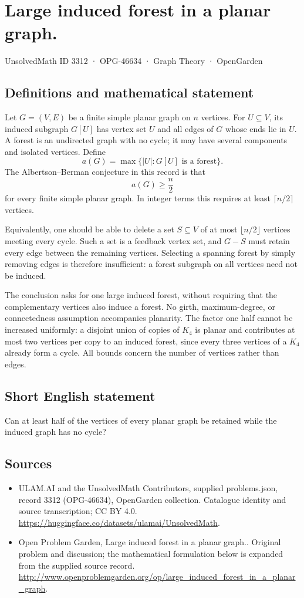 \documentclass[11pt,a4paper]{article}
\begin{document}
\section*{Large induced forest in a planar graph.}\label{3312}
{\small UnsolvedMath ID 3312 · OPG-46634 · Graph Theory · OpenGarden}
\subsection{Definitions and mathematical statement}
Let $G=(V,E)$ be a finite simple planar graph on $n$ vertices. For
$U\subseteq V$, its induced subgraph $G[U]$ has vertex set $U$ and
all edges of $G$ whose ends lie in $U$. A forest is an undirected
graph with no cycle; it may have several components and isolated
vertices. Define
\[
                      a(G)=\max\{|U|:G[U]\text{ is a forest}\}.
\]
The Albertson--Berman conjecture in this record is that
\[
                                a(G)\ge\frac n2
\]
for every finite simple planar graph. In integer terms this requires
at least $\lceil n/2\rceil$ vertices.

Equivalently, one should be able to delete a set $S\subseteq V$ of
at most $\lfloor n/2\rfloor$ vertices meeting every cycle. Such a set
is a feedback vertex set, and $G-S$ must retain every edge between
the remaining vertices. Selecting a spanning forest by simply
removing edges is therefore insufficient: a forest subgraph on all
vertices need not be induced.

The conclusion asks for one large induced forest, without requiring
that the complementary vertices also induce a forest. No girth,
maximum-degree, or connectedness assumption accompanies planarity.
The factor one half cannot be increased uniformly: a disjoint union
of copies of $K_4$ is planar and contributes at most two vertices
per copy to an induced forest, since every three vertices of a
$K_4$ already form a cycle. All bounds concern the number of
vertices rather than edges.
\subsection{Short English statement}
Can at least half of the vertices of every planar graph be retained while the induced graph has no cycle?
\subsection{Sources}
\begin{itemize}
\item[S1] ULAM.AI and the UnsolvedMath Contributors, supplied problems.json, record 3312 (OPG-46634), OpenGarden collection. Catalogue identity and source transcription; CC BY 4.0.
\url{https://huggingface.co/datasets/ulamai/UnsolvedMath}.
\item[S2] Open Problem Garden, Large induced forest in a planar graph.. Original problem and discussion; the mathematical formulation below is expanded from the supplied source record.
\url{http://www.openproblemgarden.org/op/large_induced_forest_in_a_planar_graph}.
\end{itemize}
\end{document}
